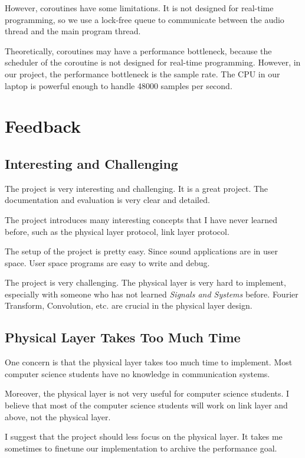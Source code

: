 \documentclass{article}
\begin{document}
However, coroutines have some limitations. It is not designed for real-time programming, so we use a lock-free queue to communicate between the audio thread and the main program thread.

Theoretically, coroutines may have a performance bottleneck,
because the scheduler of the coroutine is not designed for real-time programming. However, in our project, the performance bottleneck is the sample rate. The CPU in our laptop is powerful enough to handle 48000 samples per second.

\section{Feedback}

\subsection{Interesting and Challenging}

The project is very interesting and challenging. It is a great project.
The documentation and evaluation is very clear and detailed.

The project introduces many interesting concepts that I have never learned before, such as the physical layer protocol, link layer protocol.

The setup of the project is pretty easy.
Since sound applications are in user space. User space programs are easy to write and debug.

The project is very challenging.
The physical layer is very hard to implement, especially with someone who has not learned \textit{Signals and Systems} before. Fourier Transform, Convolution, etc. are crucial in the physical layer design.

\subsection{Physical Layer Takes Too Much Time}

One concern is that the physical layer takes too much time to implement.
Most computer science students have no knowledge in communication systems.

Moreover, the physical layer is not very useful for computer science students.
I believe that most of the computer science students will work on link layer and above, not the physical layer.

I suggest that the project should less focus on the physical layer.
It takes me sometimes to finetune our implementation to archive the performance goal.
\end{document}
